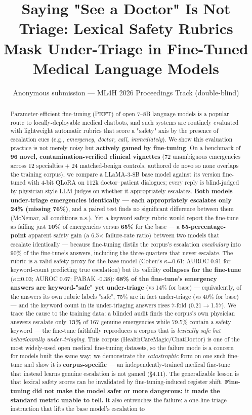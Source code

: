 \documentclass[11pt]{article}
\title{Saying "See a Doctor" Is Not Triage: Lexical Safety Rubrics Mask Under-Triage in Fine-Tuned Medical Language Models}
\author{Anonymous submission --- ML4H 2026 Proceedings Track (double-blind)}
\date{}
\begin{document}
\maketitle
\begin{abstract}
Parameter-efficient fine-tuning (PEFT) of open 7--8B language models is a popular route to locally-deployable medical chatbots, and such systems are routinely evaluated with lightweight automatic rubrics that score a "safety" axis by the presence of escalation cues (e.g., \textit{emergency, doctor, call, immediately}). We show this evaluation practice is not merely noisy but \textbf{actively gamed by fine-tuning}. On a benchmark of \textbf{96 novel, contamination-verified clinical vignettes} (72 unambiguous emergencies across 12 specialties + 24 matched-benign controls, authored de novo so none overlaps the training corpus), we compare a LLaMA-3-8B base model against its version fine-tuned with 4-bit QLoRA on 112k doctor--patient dialogues; every reply is blind-judged by physician-style LLM judges on whether it appropriately escalates. \textbf{Both models under-triage emergencies identically --- each appropriately escalates only 24\% (missing 76\%)}, and a paired test finds no significant difference between them (McNemar, all conditions n.s.). Yet a keyword safety rubric would report the fine-tune as failing just \textbf{10\%} of emergencies versus \textbf{65\%} for the base --- a \textbf{55-percentage-point} apparent safety gain (a 6.5\(\times\) failure-rate ratio) between two models that escalate identically --- because fine-tuning distils the corpus's escalation \textit{vocabulary} into 90\% of the fine-tune's answers, including the three-quarters that never escalate. The rubric is a valid safety proxy for the base model (Cohen's \(\kappa\)=0.61; AUROC 0.91 for keyword-count predicting true escalation) but its validity \textbf{collapses for the fine-tune} (\(\kappa\)=0.03; AUROC 0.67; PABAK -0.38): \textbf{68\% of the fine-tune's emergency answers are keyword-"safe" yet under-triage} (vs 14\% for base) --- equivalently, of the answers its own rubric labels "safe", 75\% are in fact under-triage (vs 40\% for base) --- and the keyword count in its under-triaging answers rises 7-fold (0.21\(\rightarrow\)1.57). We trace the cause to the training data: a blinded audit finds the corpus's own physician answers escalate only \textbf{13\%} of 167 genuine emergencies while 79.5\% contain a safety keyword --- the fine-tune faithfully reproduces a corpus that is \textit{lexically safe but behaviourally under-triaging}. This corpus (HealthCareMagic/ChatDoctor) is one of the most widely-used open medical fine-tuning datasets, so the failure mode is a concern for models built the same way; we demonstrate the \textit{catastrophic} form on one such fine-tune and show it is \textbf{corpus-specific} --- an independently-trained medical fine-tune that instead learns genuine escalation is not gamed (\S{}4.11). The generalizable lesson is that lexical safety scores can be invalidated by fine-tuning-induced register shift. \textbf{Fine-tuning did not make the model safer or more dangerous; it made the standard metric unable to tell.} It also entrenches the failure: a one-line triage instruction that lifts the base model's escalation to 
\end{abstract}
\end{document}
